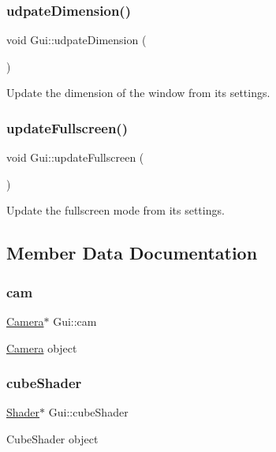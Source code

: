 \subsubsection{\texorpdfstring{udpate\+Dimension()}{udpateDimension()}}
{\footnotesize\ttfamily void Gui\+::udpate\+Dimension (\begin{DoxyParamCaption}{ }\end{DoxyParamCaption})}

Update the dimension of the window from its settings. \mbox{\label{class_gui_a42148f338094a05cfbe4ac4424ebc127}} 
\subsubsection{\texorpdfstring{update\+Fullscreen()}{updateFullscreen()}}
{\footnotesize\ttfamily void Gui\+::update\+Fullscreen (\begin{DoxyParamCaption}{ }\end{DoxyParamCaption})}

Update the fullscreen mode from its settings. 

\subsection{Member Data Documentation}
\mbox{\label{class_gui_ad69615330ffddbdb5e74dd9163434af6}} 
\subsubsection{\texorpdfstring{cam}{cam}}
{\footnotesize\ttfamily \hyperlink{class_camera}{Camera}$\ast$ Gui\+::cam}

\hyperlink{class_camera}{Camera} object \mbox{\label{class_gui_adaa7b6fc050d0e88579dfea30b1d4866}} 
\subsubsection{\texorpdfstring{cube\+Shader}{cubeShader}}
{\footnotesize\ttfamily \hyperlink{class_shader}{Shader}$\ast$ Gui\+::cube\+Shader}

Cube\+Shader object \mbox{\label{class_gui_aad8b6babe608aef719ca0180579d0c54}} 
